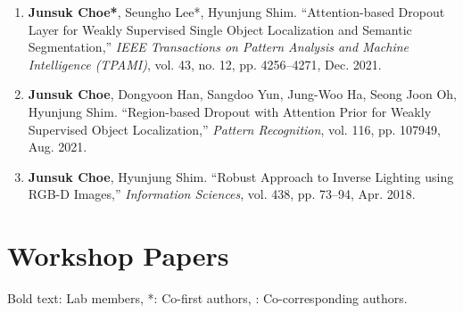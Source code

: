 \documentclass[letterpaper,11pt]{article}
\begin{document}
\begin{enumerate}[itemsep=5.5pt]
    \item \textbf{Junsuk Choe*}, Seungho Lee*, Hyunjung Shim.
    ``Attention-based Dropout Layer for Weakly Supervised Single Object Localization and Semantic Segmentation,''
    \textit{IEEE Transactions on Pattern Analysis and Machine Intelligence (TPAMI)},
    vol. 43, no. 12, pp. 4256--4271, Dec. 2021.

    \item \textbf{Junsuk Choe}, Dongyoon Han, Sangdoo Yun, Jung-Woo Ha, Seong Joon Oh, Hyunjung Shim.
    ``Region-based Dropout with Attention Prior for Weakly Supervised Object Localization,''
    \textit{Pattern Recognition},
    vol. 116, pp. 107949, Aug. 2021.

    \item \textbf{Junsuk Choe}, Hyunjung Shim.
    ``Robust Approach to Inverse Lighting using RGB-D Images,''
    \textit{Information Sciences},
    vol. 438, pp. 73--94, Apr. 2018.

\end{enumerate}


\section{Workshop Papers}
\small{Bold text: Lab members, *: Co-first authors, \textdagger: Co-corresponding authors.}
\end{document}
